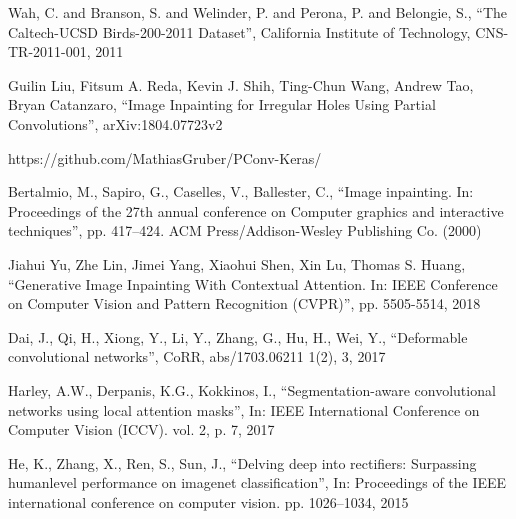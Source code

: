 \documentclass[conference]{IEEEtran}
\begin{document}
\vspace{20px}
\begin{thebibliography}{00}

 Wah, C. and Branson, S. and Welinder, P. and Perona, P. and Belongie, S., ``The Caltech-UCSD Birds-200-2011 Dataset'', California Institute of Technology, CNS-TR-2011-001, 2011

 Guilin Liu, Fitsum A. Reda, Kevin J. Shih, Ting-Chun Wang, Andrew Tao, Bryan Catanzaro, ``Image Inpainting for Irregular Holes Using Partial Convolutions'', arXiv:1804.07723v2  

 https://github.com/MathiasGruber/PConv-Keras/

\bibitem{} Bertalmio, M., Sapiro, G., Caselles, V., Ballester, C., ``Image inpainting. In: Proceedings of the 27th annual conference on Computer graphics and interactive techniques'', pp. 417–424. ACM Press/Addison-Wesley Publishing Co. (2000)  

\bibitem{} Jiahui Yu, Zhe Lin, Jimei Yang, Xiaohui Shen, Xin Lu, Thomas S. Huang, ``Generative Image Inpainting With Contextual Attention. In: IEEE Conference on Computer Vision and Pattern Recognition (CVPR)'', pp. 5505-5514, 2018

\bibitem{} Dai, J., Qi, H., Xiong, Y., Li, Y., Zhang, G., Hu, H., Wei, Y., ``Deformable convolutional networks'', CoRR, abs/1703.06211 1(2), 3, 2017

\bibitem{} Harley, A.W., Derpanis, K.G., Kokkinos, I., ``Segmentation-aware convolutional networks using local attention masks'', In: IEEE International Conference on Computer Vision (ICCV). vol. 2, p. 7, 2017

\bibitem{} He, K., Zhang, X., Ren, S., Sun, J., ``Delving deep into rectifiers: Surpassing humanlevel performance on imagenet classification'', In: Proceedings of the IEEE international conference on computer vision. pp. 1026–1034, 2015


\end{thebibliography}
\end{document}
